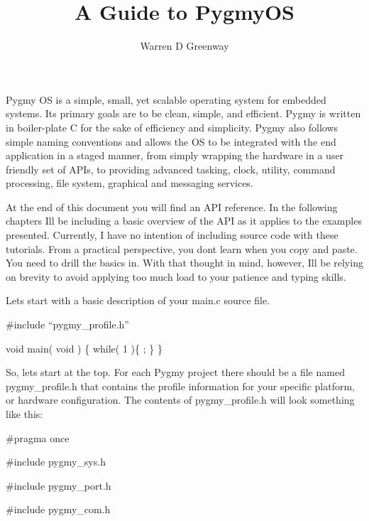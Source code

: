 \documentclass{article}
\begin{document}
\title{A Guide to PygmyOS}
\author{Warren D Greenway}
\maketitle

Pygmy OS is a simple, small, yet scalable operating system for embedded systems. It{\textquotesingle}s primary goals are to be clean, simple, and efficient. Pygmy is written in boiler-plate C for the sake of efficiency and simplicity. Pygmy also follows simple naming conventions and allows the OS to be integrated with the end application in a staged manner, from simply wrapping the hardware in a user friendly set of APIs, to providing advanced tasking, clock, utility, command processing, file system, graphical and messaging services.

At the end of this document you will find an API reference. In the following chapters I{\textquotesingle}ll be including a basic overview of the API as it applies to the examples presented. Currently, I have no intention of including source code with these tutorials. From a practical perspective, you don{\textquotesingle}t learn when you copy and paste. You need to drill the basics in. With that thought in mind, however, I{\textquotesingle}ll be relying on brevity to avoid applying too much load to your patience and typing skills.

Let{\textquotesingle}s start with a basic description of your {\textquotesingle}main.c{\textquotesingle} source file.

\#include {\textquotedblleft}pygmy\_profile.h{\textquotedblright}

void main( void )
\{
while( 1 )\{ ; \}
\}


\bigskip

So, let{\textquotesingle}s start at the top. For each Pygmy project there should be a file named {\textquotesingle}pygmy\_profile.h{\textquotesingle} that contains the profile information for your specific platform, or hardware configuration. The contents of {\textquotesingle}pygmy\_profile.h{\textquotesingle} will look something like this:


\bigskip

\#pragma once


\bigskip

\#include {\textquotedbl}pygmy\_sys.h{\textquotedbl}

\#include {\textquotedbl}pygmy\_port.h{\textquotedbl}

\#include {\textquotedbl}pygmy\_com.h{\textquotedbl}
\end{document}
